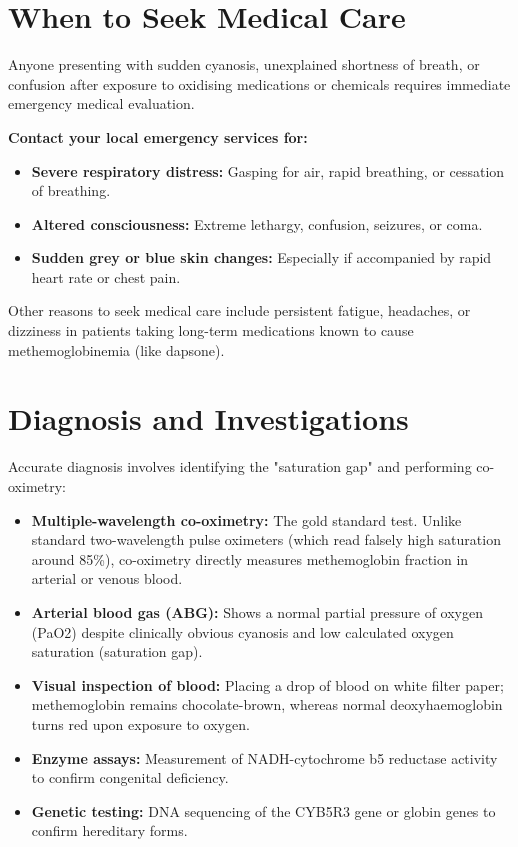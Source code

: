 \section*{When to Seek Medical Care}
Anyone presenting with sudden cyanosis, unexplained shortness of breath, or confusion after exposure to oxidising medications or chemicals requires immediate emergency medical evaluation.

\textbf{Contact your local emergency services for:}
\begin{itemize}
    \item \textbf{Severe respiratory distress:} Gasping for air, rapid breathing, or cessation of breathing.
    \item \textbf{Altered consciousness:} Extreme lethargy, confusion, seizures, or coma.
    \item \textbf{Sudden grey or blue skin changes:} Especially if accompanied by rapid heart rate or chest pain.
\end{itemize}
Other reasons to seek medical care include persistent fatigue, headaches, or dizziness in patients taking long-term medications known to cause methemoglobinemia (like dapsone).

\section*{Diagnosis and Investigations}
Accurate diagnosis involves identifying the "saturation gap" and performing co-oximetry:
\begin{itemize}
    \item \textbf{Multiple-wavelength co-oximetry:} The gold standard test. Unlike standard two-wavelength pulse oximeters (which read falsely high saturation around 85\%), co-oximetry directly measures methemoglobin fraction in arterial or venous blood.
    \item \textbf{Arterial blood gas (ABG):} Shows a normal partial pressure of oxygen (PaO2) despite clinically obvious cyanosis and low calculated oxygen saturation (saturation gap).
    \item \textbf{Visual inspection of blood:} Placing a drop of blood on white filter paper; methemoglobin remains chocolate-brown, whereas normal deoxyhaemoglobin turns red upon exposure to oxygen.
    \item \textbf{Enzyme assays:} Measurement of NADH-cytochrome b5 reductase activity to confirm congenital deficiency.
    \item \textbf{Genetic testing:} DNA sequencing of the CYB5R3 gene or globin genes to confirm hereditary forms.
\end{itemize}

